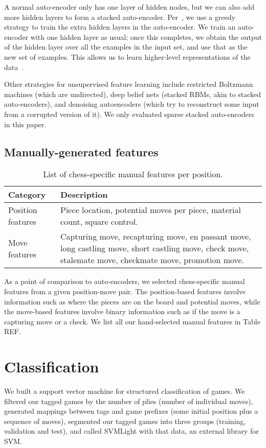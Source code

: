 \documentclass[11pt]{article}
\begin{document}
A normal auto-encoder only has one layer of hidden nodes, but we can also add more hidden layers to form a stacked auto-encoder. Per~\cite{Bengio07greedylayer-wise}, we use a greedy strategy to train the extra hidden layers in the auto-encoder. We train an auto-encoder with one hidden layer as usual; once this completes, we obtain the output of the hidden layer over all the examples in the input set, and use that as the new set of examples. This allows us to learn higher-level representations of the data~\cite{Vincent}.

Other strategies for unsupervised feature learning include restricted Boltzmann machines (which are undirected), deep belief nets (stacked RBMs, akin to stacked auto-encoders), and denoising autoencoders (which try to reconstruct some input from a corrupted version of it). We only evaluated sparse stacked auto-encoders in this paper.

\subsection{Manually-generated features}
\begin{table*}
\centering
\begin{tabular}{lp{}}
\hline
\textbf{Category} & \textbf{Description} \\ \hline
Position features & Piece location, potential moves per piece, material count, square control. \\
Move features & Capturing move, recapturing move, en passant move, long castling move, short castling move, check move, stalemate move, checkmate move, promotion move. \\
\hline
\end{tabular} 
\caption{List of chess-specific manual features per position.}
\end{table*}

As a point of comparison to auto-encoders, we selected chess-specific manual features from a given position-move pair.  The position-based features involve information such as where the pieces are on the board and potential moves, while the move-based features involve binary information such as if the move is a capturing move or a check.  We list all our hand-selected manual features in Table REF.

\section{Classification}
We built a support vector machine for structured classification of games. We filtered our tagged games by the number of plies (number of individual moves), generated mappings between tags and game prefixes (some initial position plus a sequence of moves), segmented our tagged games into three groups (training, validation and test), and called SVMLight with that data, an external library for SVM.
\end{document}
